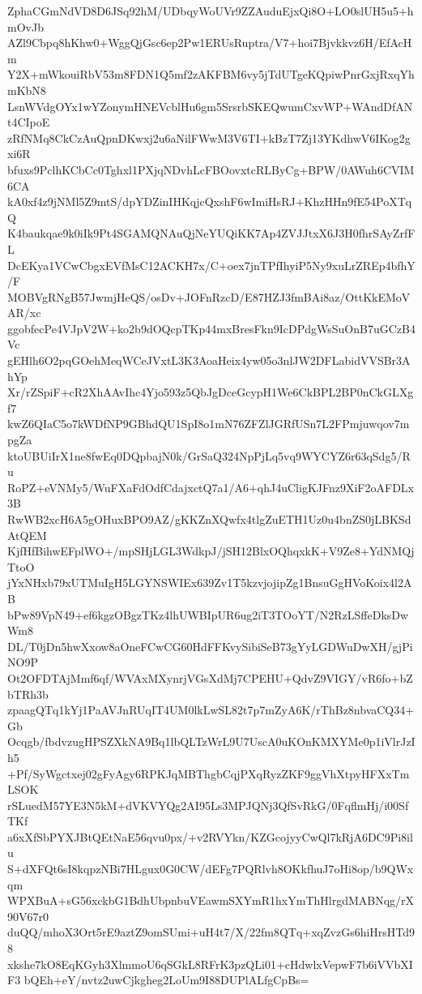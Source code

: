 ZphaCGmNdVD8D6JSq92hM/UDbqyWoUVr9ZZAuduEjxQi8O+LO0slUH5u5+hmOvJb
AZl9Cbpq8hKhw0+WggQjGsc6ep2Pw1ERUsRuptra/V7+hoi7Bjvkkvz6H/EfAcHm
Y2X+mWkouiRbV53m8FDN1Q5mf2zAKFBM6vy5jTdUTgeKQpiwPnrGxjRxqYhmKbN8
LsnWVdgOYx1wYZonymHNEVcblHu6gm5SrsrbSKEQwumCxvWP+WAndDfANt4CIpoE
zRfNMq8CkCzAuQpnDKwxj2u6aNilFWwM3V6TI+kBzT7Zj13YKdhwV6IKog2gxi6R
bfuxs9PclhKCbCc0Tghxl1PXjqNDvhLcFBOovxtcRLByCg+BPW/0AWuh6CVIM6CA
kA0xf4z9jNMl5Z9mtS/dpYDZinIHKqjcQxshF6wImiHsRJ+KhzHHn9fE54PoXTqQ
K4baukqae9k0iIk9Pt4SGAMQNAuQjNeYUQiKK7Ap4ZVJJtxX6J3H0fhrSAyZrfFL
DcEKya1VCwCbgxEVfMsC12ACKH7x/C+oex7jnTPfIhyiP5Ny9xuLrZREp4bfhY/F
MOBVgRNgB57JwmjHeQS/osDv+JOFnRzcD/E87HZJ3fmBAi8az/OttKkEMoVAR/xc
ggobfecPe4VJpV2W+ko2b9dOQcpTKp44mxBresFkn9IcDPdgWsSuOnB7uGCzB4Vc
gEHlh6O2pqGOehMeqWCeJVxtL3K3AoaHeix4yw05o3nlJW2DFLabidVVSBr3AhYp
Xr/rZSpiF+cR2XhAAvIhc4Yjo593z5QbJgDceGcypH1We6CkBPL2BP0nCkGLXgf7
kwZ6QIaC5o7kWDfNP9GBhdQU1SpI8o1mN76ZFZlJGRfUSn7L2FPmjuwqov7mpgZa
ktoUBUiIrX1ne8fwEq0DQpbajN0k/GrSaQ324NpPjLq5vq9WYCYZ6r63qSdg5/Ru
RoPZ+eVNMy5/WuFXaFdOdfCdajxctQ7a1/A6+qhJ4uCligKJFnz9XiF2oAFDLx3B
RwWB2xcH6A5gOHuxBPO9AZ/gKKZnXQwfx4tlgZuETH1Uz0u4bnZS0jLBKSdAtQEM
KjfHfBihwEFplWO+/mpSHjLGL3WdkpJ/jSH12BlxOQhqxkK+V9Ze8+YdNMQjTtoO
jYxNHxb79xUTMuIgH5LGYNSWIEx639Zv1T5kzvjojipZg1BnsuGgHVoKoix4l2AB
bPw89VpN49+ef6kgzOBgzTKz4lhUWBIpUR6ug2iT3TOoYT/N2RzLSffeDksDwWm8
DL/T0jDn5hwXxow8aOneFCwCG60HdFFKvySibiSeB73gYyLGDWuDwXH/gjPiNO9P
Ot2OFDTAjMmf6qf/WVAxMXynrjVGsXdMj7CPEHU+QdvZ9VIGY/vR6fo+bZbTRh3b
zpaagQTq1kYj1PaAVJnRUqIT4UM0lkLwSL82t7p7mZyA6K/rThBz8nbvaCQ34+Gb
Ocqgb/fbdvzugHPSZXkNA9Bq1lbQLTzWrL9U7UscA0uKOnKMXYMe0p1iVlrJzIh5
+Pf/SyWgctxej02gFyAgy6RPKJqMBThgbCqjPXqRyzZKF9ggVhXtpyHFXxTmLSOK
rSLuedM57YE3N5kM+dVKVYQg2AI95Ls3MPJQNj3QfSvRkG/0FqflmHj/i00SfTKf
a6xXfSbPYXJBtQEtNaE56qvu0px/+v2RVYkn/KZGcojyyCwQl7kRjA6DC9Pi8ilu
S+dXFQt6sI8kqpzNBi7HLgux0G0CW/dEFg7PQRlvh8OKkfhuJ7oHi8op/b9QWxqm
WPXBuA+sG56xckbG1BdhUbpnbuVEawmSXYmR1hxYmThHlrgdMABNqg/rX90V67r0
duQQ/mhoX3Ort5rE9aztZ9omSUmi+uH4t7/X/22fm8QTq+xqZvzGs6hiHrsHTd98
xkshe7kO8EqKGyh3XlmmoU6qSGkL8RFrK3pzQLi01+cHdwlxVepwF7b6iVVbXIF3
bQEh+eY/nvtz2uwCjkgheg2LoUm9I88DUPlALfgCpBs=
